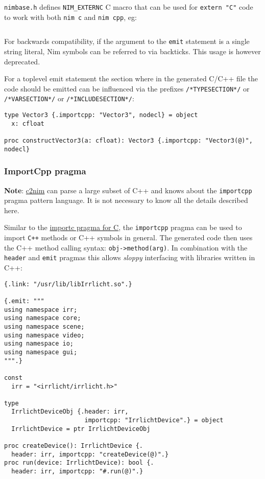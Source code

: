\texttt{nimbase.h} defines \texttt{NIM\_EXTERNC} C macro that can be
used for \texttt{extern\ "C"} code to work with both \texttt{nim\ c} and
\texttt{nim\ cpp}, eg:

\begin{verbatim}
\end{verbatim}

For backwards compatibility, if the argument to the \texttt{emit}
statement is a single string literal, Nim symbols can be referred to via
backticks. This usage is however deprecated.

For a toplevel emit statement the section where in the generated C/C++
file the code should be emitted can be influenced via the prefixes
\texttt{/*TYPESECTION*/} or \texttt{/*VARSECTION*/} or
\texttt{/*INCLUDESECTION*/}:

\begin{verbatim}
type Vector3 {.importcpp: "Vector3", nodecl} = object
  x: cfloat

proc constructVector3(a: cfloat): Vector3 {.importcpp: "Vector3(@)", nodecl}
\end{verbatim}

\hypertarget{importcpp-pragma}{%
\subsubsection{ImportCpp pragma}\label{importcpp-pragma}}

\textbf{Note}:
\href{https://github.com/nim-lang/c2nim/blob/master/doc/c2nim.rst}{c2nim}
can parse a large subset of C++ and knows about the \texttt{importcpp}
pragma pattern language. It is not necessary to know all the details
described here.

Similar to the
\protect\hyperlink{foreign-function-interface-importc-pragma}{importc
pragma for C}, the \texttt{importcpp} pragma can be used to import
\texttt{C++} methods or C++ symbols in general. The generated code then
uses the C++ method calling syntax:
\texttt{obj-\textgreater{}method(arg)}. In combination with the
\texttt{header} and \texttt{emit} pragmas this allows \emph{sloppy}
interfacing with libraries written in C++:

\begin{verbatim}
{.link: "/usr/lib/libIrrlicht.so".}

{.emit: """
using namespace irr;
using namespace core;
using namespace scene;
using namespace video;
using namespace io;
using namespace gui;
""".}

const
  irr = "<irrlicht/irrlicht.h>"

type
  IrrlichtDeviceObj {.header: irr,
                      importcpp: "IrrlichtDevice".} = object
  IrrlichtDevice = ptr IrrlichtDeviceObj

proc createDevice(): IrrlichtDevice {.
  header: irr, importcpp: "createDevice(@)".}
proc run(device: IrrlichtDevice): bool {.
  header: irr, importcpp: "#.run(@)".}
\end{verbatim}

